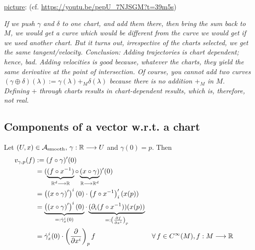 \underline{picture}: (cf. \url{https://youtu.be/pepU_7NJSGM?t=39m5s})

\textit{If we push $\gamma$ and $\delta$ to one chart, and add them there, then bring the sum back to $M$, we would get a curve which would be different from the curve we would get if we used another chart. But it turns out, irrespective of the charts selected, we get the same tangent/velocity. Conclusion: Adding trajectories is chart dependent; hence, bad. Adding velocities is good because, whatever the charts, they yield the same derivative at the point of intersection. Of course, you cannot add two curves $(\gamma \oplus \delta)(\lambda) := \gamma(\lambda) +_M \delta(\lambda)$ because there is no addition $+_M$ in $M$. Defining $+$ through charts results in chart-dependent results, which is, therefore, not real.}  

\subsection{Components of a vector w.r.t. a chart}

Let $(U,x) \in \A_{\text{smooth}}, \, \gamma : \R \to U$ and $\gamma(0) = p$. Then
\begin{align*}
  v_{\gamma,p}(f) & := (f \after \gamma)^\prime(0) \\
  & = (\underbrace{(f \after x^{-1})}_{\R^d \to \R} \after \underbrace{(x \after \gamma)}_{\R \to \R^d})^\prime(0) \\
  & = \displaystyle\left(\left(x \after \gamma\right)^\prime\right)^i(0) \cdot \left(f \after x^{-1}\right)^\prime_i(x(p)) \\
  & = \underbrace{\displaystyle\left(\left(x \after \gamma\right)^\prime\right)^i(0)}_{=: \dot{\gamma}_x^i(0)} \cdot \underbrace{(\partial_i(f \after x^{-1}))(x(p))}_{=: \left(\cibasis[f]{x^i}\right)_p} \\
  & = \dot{\gamma}_x^i(0) \cdot \left(\cibasis{x^i}\right)_p f && \forall \, f \in C^{\infty}(M), f : M \to \R
\end{align*}

